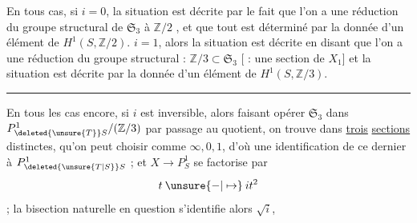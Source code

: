 
En tous cas, si $i=0$, la situation est décrite par le fait que l'on a  une réduction du groupe structural de $\mathfrak S_3$ à $\mathbb Z/2$ , et que tout est déterminé par la donnée d'un élément de $H^1(S,\mathbb Z/2)$.   $i=1$, alors la situation est décrite en disant que l'on a une réduction du groupe structural : $\mathbb Z/3\subset\mathfrak S_3$ [ : une section de  $X_1$] et la situation est décrite par la donnée d'un élément de $H^1(S,\mathbb Z/3)$.

\noindent\rule{.22\linewidth}{.4pt}

 En tous les cas encore, si $i$ est inversible, alors faisant opérer $\mathfrak S_3$ dans $P^1_{\deleted{\unsure{T}}S}/(\mathbb Z/3)$ par passage au quotient, on trouve dans    \uline{trois} \uline{sections} distinctes,  qu'on peut choisir comme $\infty,0,1$, d'où une identification de ce dernier à $P^1_{\deleted{\unsure{T|S}}S}$ ; et $X\longrightarrow P^1_S$ se factorise par
\[
t\mathbin{\unsure{-|\mapsto}}it^2
\]
; la bisection naturelle en question s'identifie alors  $\sqrt{i}$,
